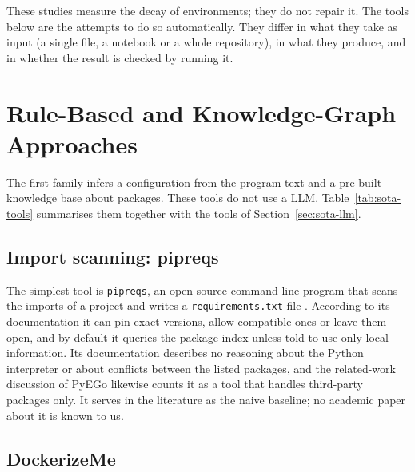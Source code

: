These studies measure the decay of environments; they do not repair it. The tools below are the attempts to do so automatically. They differ in what they take as input (a single file, a notebook or a whole repository), in what they produce, and in whether the result is checked by running it.

\section{Rule-Based and Knowledge-Graph Approaches}\label{sec:sota-classical}

The first family infers a configuration from the program text and a pre-built knowledge base about packages. These tools do not use a \ac{LLM}. Table~\ref{tab:sota-tools} summarises them together with the tools of Section~\ref{sec:sota-llm}.

\subsection{Import scanning: pipreqs}

The simplest tool is \texttt{pipreqs}, an open-source command-line program that scans the imports of a project and writes a \texttt{requirements.txt} file \cite{pipreqs}. According to its documentation it can pin exact versions, allow compatible ones or leave them open, and by default it queries the package index unless told to use only local information. Its documentation describes no reasoning about the Python interpreter or about conflicts between the listed packages, and the related-work discussion of PyEGo \cite{ye2022pyego} likewise counts it as a tool that handles third-party packages only. It serves in the literature as the naive baseline; no academic paper about it is known to us.%

\subsection{DockerizeMe}

